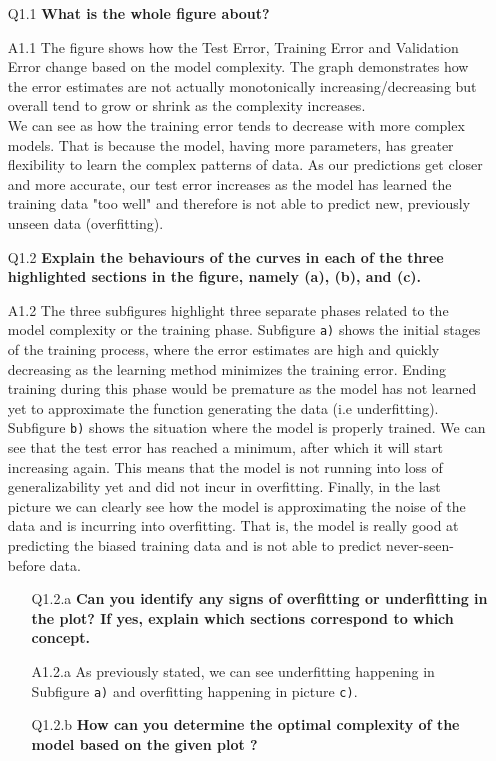 \documentclass[tikz,14pt,fleqn]{article}
\begin{document}
\begin{itemize}
\item[Q1.1] \textbf{What is the whole figure about?}
\item[A1.1] The figure shows how the Test Error, Training Error and Validation Error change based on the model complexity. The graph demonstrates how the error estimates are not actually monotonically increasing/decreasing but overall tend to grow or shrink as the complexity increases.\\
We can see as how the training error tends to decrease with more complex models. That is because the model, having more parameters, has greater flexibility to learn the complex patterns of data. As our predictions get closer and more accurate, our test error increases as the model has learned the training data "too well" and therefore is not able to predict new, previously unseen data (overfitting).
\item[Q1.2] \textbf{Explain the behaviours of the curves in each of the three highlighted sections in the figure, namely (a), (b), and (c).}   
\item[A1.2] The three subfigures highlight three separate phases related to the model complexity or the training phase. Subfigure \verb|a)| shows the initial stages of the training process, where the error estimates are high and quickly decreasing as the learning method minimizes the training error. Ending training during this phase would be premature as the model has not learned yet to approximate the function generating the data (i.e underfitting). Subfigure \verb|b)| shows the situation where the model is properly trained. We can see that the test error has reached a minimum, after which it will start increasing again. This means that the model is not running into loss of generalizability yet and did not incur in overfitting. Finally, in the last picture we can clearly see how the model is approximating the noise of the data and is incurring into overfitting. That is, the model is really good at predicting the biased training data and is not able to predict never-seen-before data.
\begin{itemize}
\item[Q1.2.a] \textbf{Can you identify any signs of overfitting or underfitting in the plot? If yes, explain which sections correspond to which concept.}
\item[A1.2.a] As previously stated, we can see underfitting happening in Subfigure \verb|a)| and overfitting happening in picture \verb|c)|.
\item[Q1.2.b] \textbf{How can you determine the optimal complexity of the model based on the given plot ?}

\end{itemize}
\end{itemize}
\end{document}
